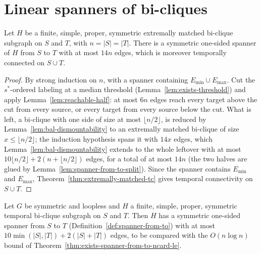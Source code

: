 \section*{Linear spanners of bi-cliques}

\begin{theorem}
  \label{thm:spanner-extremally-matched}
  \leanok
  Let $H$ be a finite, simple, proper, symmetric extremally matched bi-clique
  subgraph on $S$ and $T$, with $n = |S| = |T|$. There is a symmetric
  one-sided spanner of $H$ from $S$ to $T$ with at most $14n$ edges, which is
  moreover temporally connected on $S \cup T$.
\end{theorem}

\begin{proof}
  \leanok
  By strong induction on $n$, with a spanner containing $E_{\min} \cup
  E_{\max}$. Cut the $s^*$-ordered labeling at a median threshold
  (Lemma~\ref{lem:exists-threshold}) and apply
  Lemma~\ref{lem:reachable-half}: at most $6n$ edges reach every target above
  the cut from every source, or every target from every source below the cut.
  What is left, a bi-clique with one side of size at most $\lfloor n/2 \rfloor$,
  is reduced by Lemma~\ref{lem:bal-dismountability} to an extremally matched
  bi-clique of size $x \le \lfloor n/2 \rfloor$; the induction hypothesis
  spans it with $14x$ edges, which Lemma~\ref{lem:bal-dismountability} extends
  to the whole leftover with at most $10 \lfloor n/2 \rfloor + 2(n + \lfloor n/2 \rfloor)$
  edges, for a total of at most $14n$ (the two halves are glued by
  Lemma~\ref{lem:spanner-from-to-split}). Since the spanner contains $E_{\min}$
  and $E_{\max}$, Theorem~\ref{thm:extremally-matched-tc} gives temporal
  connectivity on $S \cup T$.
\end{proof}

\begin{theorem}
  \label{thm:linear-biclique-spanner}
  \leanok
  Let $G$ be symmetric and loopless and $H$ a finite, simple, proper,
  symmetric temporal bi-clique subgraph on $S$ and $T$. Then $H$ has a
  symmetric one-sided spanner from $S$ to $T$
  (Definition~\ref{def:spanner-from-to}) with at most
  $10 \min(|S|, |T|) + 2(|S| + |T|)$ edges, to be compared with the
  $O(n \log n)$ bound of Theorem~\ref{thm:exists-spanner-from-to-ncard-le}.
\end{theorem}

